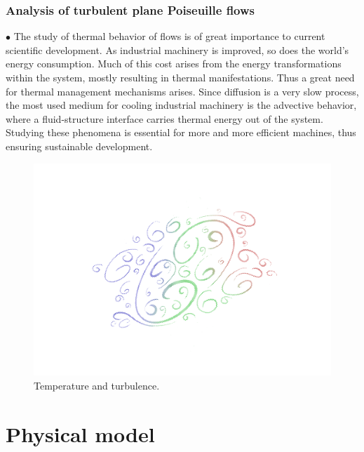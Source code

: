 \documentclass[xcolor=dvipsnames,8pt,aspectratio=34]{beamer}
\begin{document}
	
		\begin{frame}
		\frametitle{Analysis of turbulent plane Poiseuille flows}
			\begin{minipage}[h!]{0.49\textwidth}
			$\bullet$ The study of thermal behavior of flows is of great importance to current scientific development. As industrial machinery is improved, so does the world's energy consumption. Much of this cost arises from the energy transformations within the system, mostly resulting in thermal manifestations. Thus a great need for thermal management mechanisms arises. Since diffusion is a very slow process, the most used medium for cooling industrial machinery is the advective behavior, where a fluid-structure interface carries thermal energy out of the system. Studying these phenomena is essential for more and more efficient machines, thus ensuring sustainable development. 
		\end{minipage}
		\begin{minipage}[h!]{0.49\textwidth}
			\begin{figure}[h!]
				\centering
				\includegraphics[trim = {1.7cm 2cm 0 1cm}, clip , angle=0, scale=0.40]{turbulence}
				\caption{Temperature and turbulence.}
			\end{figure}
		\end{minipage}
		\end{frame}





	\section{Physical model}
	
\end{document}
